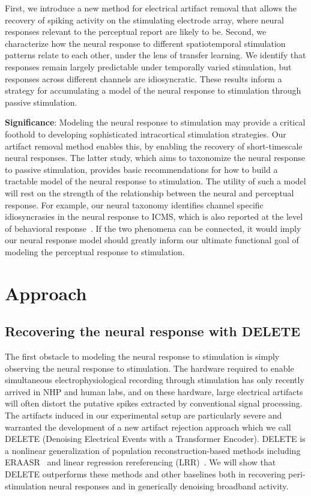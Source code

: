 \documentclass[12pt,oneside]{report}
\begin{document}
First, we introduce a new method for electrical artifact removal that allows the recovery of spiking activity on the stimulating electrode array, where neural responses relevant to the perceptual report are likely to be. Second, we characterize how the neural response to different spatiotemporal stimulation patterns relate to each other, under the lens of transfer learning. We identify that responses remain largely predictable under temporally varied stimulation, but responses across different channels are idiosyncratic. These results inform a strategy for accumulating a model of the neural response to stimulation through passive stimulation.

\textbf{Significance}: Modeling the neural response to stimulation may provide a critical foothold to developing sophisticated intracortical stimulation strategies. Our artifact removal method enables this, by enabling the recovery of short-timescale neural responses. The latter study, which aims to taxonomize the neural response to passive stimulation, provides basic recommendations for how to build a tractable model of the neural response to stimulation. The utility of such a model will rest on the strength of the relationship between the neural and perceptual response. For example, our neural taxonomy identifies channel specific idiosyncrasies in the neural response to ICMS, which is also reported at the level of behavioral response~\citep{greenspon_25_stable,hughes2021perception}. If the two phenomena can be connected, it would imply our neural response model should greatly inform our ultimate functional goal of modeling the perceptual response to stimulation.

\section{Approach}
\subsection*{Recovering the neural response with DELETE}
The first obstacle to modeling the neural response to stimulation is simply observing the neural response to stimulation. The hardware required to enable simultaneous electrophysiological recording through stimulation has only recently arrived in NHP and human labs, and on these hardware, large electrical artifacts will often distort the putative spikes extracted by conventional signal processing. The artifacts induced in our experimental setup are particularly severe and warranted the development of a new artifact rejection approach which we call DELETE (Denoising Electrical Events with a Transformer Encoder). DELETE is a nonlinear generalization of population reconstruction-based methods including ERAASR~\citep{oshea2018eraasr} and linear regression rereferencing (LRR)~\citep{young2018signal}.  We will show that DELETE outperforms these methods and other baselines both in recovering peri-stimulation neural responses and in generically denoising broadband activity.
\end{document}
